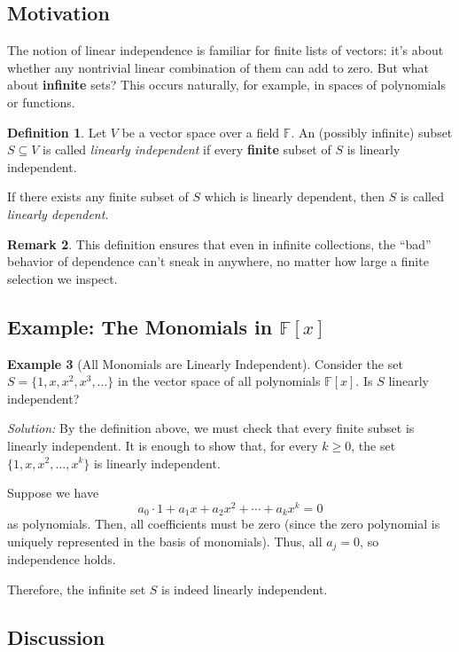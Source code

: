 \documentclass[11pt]{article}
\theoremstyle{definition}
\newtheorem{definition}{Definition}[section]
\newtheorem{example}[definition]{Example}
\newtheorem{remark}[definition]{Remark}
\theoremstyle{plain}
\begin{document}
\subsection{Motivation}
The notion of linear independence is familiar for finite lists of vectors: it's about whether any nontrivial linear combination of them can add to zero. But what about \textbf{infinite} sets? This occurs naturally, for example, in spaces of polynomials or functions.

\begin{definition}
Let $V$ be a vector space over a field $\mathbb{F}$. An (possibly infinite) subset $S \subseteq V$ is called \emph{linearly independent} if every \textbf{finite} subset of $S$ is linearly independent. 

If there exists any finite subset of $S$ which is linearly dependent, then $S$ is called \emph{linearly dependent}.
\end{definition}

\begin{remark}
This definition ensures that even in infinite collections, the ``bad'' behavior of dependence can't sneak in anywhere, no matter how large a finite selection we inspect.
\end{remark}

\subsection{Example: The Monomials in $\mathbb{F}[x]$}

\begin{example}[All Monomials are Linearly Independent]
Consider the set $S = \{1, x, x^2, x^3, \ldots\}$ in the vector space of all polynomials $\mathbb{F}[x]$. Is $S$ linearly independent?

\emph{Solution:} By the definition above, we must check that every finite subset is linearly independent.
It is enough to show that, for every $k\geq 0$, the set $\{1, x, x^2, \ldots, x^k\}$ is linearly independent.

Suppose we have
\[
a_0 \cdot 1 + a_1 x + a_2 x^2 + \cdots + a_k x^k = 0
\]
as polynomials. Then, all coefficients must be zero (since the zero polynomial is uniquely represented in the basis of monomials). Thus, all $a_j = 0$, so independence holds.

Therefore, the infinite set $S$ is indeed linearly independent.
\end{example}

\subsection{Discussion}
\end{document}
